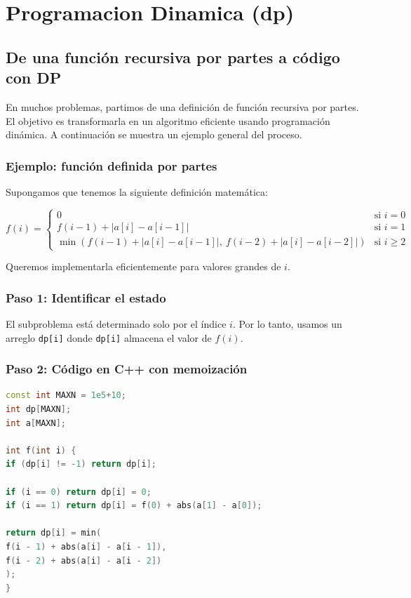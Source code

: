 \chapter{Programacion Dinamica (dp)}

\section{De una función recursiva por partes a código con DP}

En muchos problemas, partimos de una definición de función recursiva por partes. El objetivo es transformarla en un algoritmo eficiente usando programación dinámica. A continuación se muestra un ejemplo general del proceso.

\subsection*{Ejemplo: función definida por partes}

Supongamos que tenemos la siguiente definición matemática:

\[
f(i) =
\begin{cases}
0 & \text{si } i = 0 \\
f(i - 1) + |a[i] - a[i-1]| & \text{si } i = 1 \\
\min(f(i - 1) + |a[i] - a[i-1]|,\ f(i - 2) + |a[i] - a[i-2]|) & \text{si } i \ge 2
\end{cases}
\]

Queremos implementarla eficientemente para valores grandes de \( i \).

\subsection*{Paso 1: Identificar el estado}

El subproblema está determinado solo por el índice \( i \). Por lo tanto, usamos un arreglo \texttt{dp[i]} donde \texttt{dp[i]} almacena el valor de \( f(i) \).

\subsection*{Paso 2: Código en C++ con memoización}

\begin{lstlisting}[language=C++, caption=Función recursiva con memoización]
const int MAXN = 1e5+10;
int dp[MAXN];
int a[MAXN];

int f(int i) {
if (dp[i] != -1) return dp[i];

if (i == 0) return dp[i] = 0;
if (i == 1) return dp[i] = f(0) + abs(a[1] - a[0]);

return dp[i] = min(
f(i - 1) + abs(a[i] - a[i - 1]),
f(i - 2) + abs(a[i] - a[i - 2])
);
}
\end{lstlisting}

